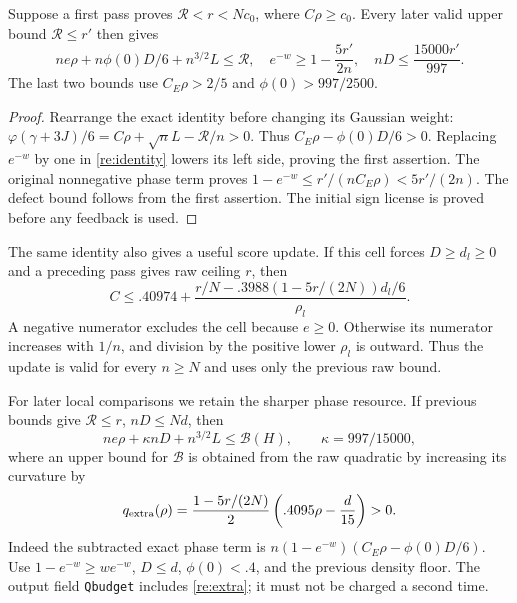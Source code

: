 \begin{lemma}\label{re:weight}
Suppose a first pass proves $\mathcal R<r<Nc_0$, where $C\rho\ge c_0$.
Every later valid upper bound $\mathcal R\le r'$ then gives
\begin{equation}\label{re:unweighted}
 ne\rho+n\phi(0)D/6+n^{3/2}L\le\mathcal R,
 \quad e^{-w}\ge1-\frac{5r'}{2n},
 \quad nD\le\frac{15000r'}{997}.
\end{equation}
The last two bounds use $C_E\rho>2/5$ and $\phi(0)>997/2500$.
\end{lemma}
\begin{proof}
Rearrange the exact identity before changing its Gaussian weight:
$\varphi(\gamma+3J)/6=C\rho+\sqrt nL-\mathcal R/n>0$.
Thus $C_E\rho-\phi(0)D/6>0$. Replacing $e^{-w}$ by one in
\eqref{re:identity} lowers its left side, proving the first assertion.
The original nonnegative phase term proves
$1-e^{-w}\le r'/(nC_E\rho)<5r'/(2n)$. The defect bound follows from
the first assertion. The initial sign license is proved before any
feedback is used.
\end{proof}

The same identity also gives a useful score update. If this cell forces
$D\ge d_l\ge0$ and a preceding pass gives raw ceiling $r$, then
\[
 C\le .40974+
 \frac{r/N-.3988(1-5r/(2N))d_l/6}{\rho_l}.
\]
A negative numerator excludes the cell because $e\ge0$. Otherwise its
numerator increases with $1/n$, and division by the positive lower
$\rho_l$ is outward. Thus the update is valid for every $n\ge N$ and
uses only the previous raw bound.

For later local comparisons we retain the sharper phase resource.
If previous bounds give $\mathcal R\le r$, $nD\le Nd$, then
\begin{equation}\label{re:phaseprice}
 ne\rho+\kappa nD+n^{3/2}L
 \le \mathcal B(H),\qquad \kappa=997/15000,
\end{equation}
where an upper bound for $\mathcal B$ is obtained from the raw
quadratic by increasing its curvature by
\begin{equation}\label{re:extra}
 q_{\rm extra}(\rho)=\frac{1-5r/(2N)}2
                         \left(.4095\rho-\frac d{15}\right)>0.
\end{equation}
Indeed the subtracted exact phase term is
$n(1-e^{-w})(C_E\rho-\phi(0)D/6)$.
Use $1-e^{-w}\ge we^{-w}$, $D\le d$, $\phi(0)<.4$, and the
previous density floor. The output field \texttt{Qbudget} includes
\eqref{re:extra}; it must not be charged a second time.

